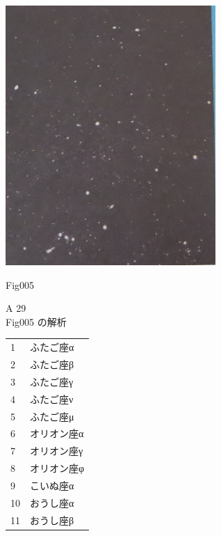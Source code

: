 \documentclass{jarticle}
\begin{document}
 \newpage


\begin{minipage}{8cm}
\includegraphics[width=8cm, clip]{fig005.jpg}
\begin{center}
Fig005
\end{center}

A 29 \\
Fig005 の解析\\
  
 
 \setlength{}  
\end{minipage}
\begin{minipage}{3cm}
\vspace{10cm}
\begin{tabular}{ll}
1&ふたご座α\\
2&ふたご座β\\
3&ふたご座γ\\
4&ふたご座ν\\
5&ふたご座μ\\
6&オリオン座α\\
7&オリオン座γ\\
8&オリオン座φ\\
9&こいぬ座α\\
10&おうし座α\\
11&おうし座β\\
\end{tabular}
\end{minipage}
\vspace{1cm}
\end{document}
